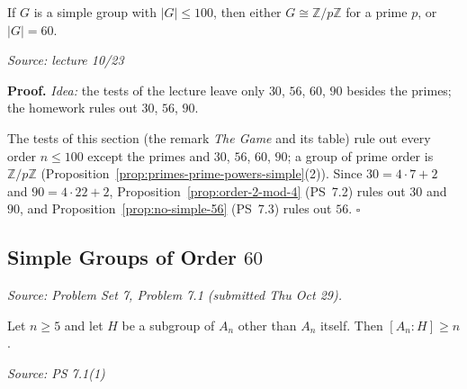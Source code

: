 \documentclass[11pt]{report}
\renewenvironment{proof}[1][Proof]{\noindent\textbf{#1.} }{\hfill$\square$\par\vspace{5pt}}
\newcommand{\srcline}[1]{\par\hfill{\footnotesize\textit{Source: #1}}}
\begin{document}
\begin{thmbox}\label{thm:simple-order-le-100}
If $G$ is a simple group with $|G| \leq 100$, then either $G \cong \mathbb{Z}/p\mathbb{Z}$ for a prime $p$, or $|G| = 60$.
\srcline{lecture 10/23}
\end{thmbox}

\begin{proof}
\textit{Idea:} the tests of the lecture leave only $30$, $56$, $60$, $90$ besides the primes; the homework rules out $30$, $56$, $90$.\par
The tests of this section (the remark \emph{The Game} and its table) rule out every order $n \le 100$ except the primes and $30$, $56$, $60$, $90$; a group of prime order is $\mathbb{Z}/p\mathbb{Z}$ (Proposition~\ref{prop:primes-prime-powers-simple}(2)). Since $30 = 4 \cdot 7 + 2$ and $90 = 4 \cdot 22 + 2$, Proposition~\ref{prop:order-2-mod-4} (PS~7.2) rules out $30$ and $90$, and Proposition~\ref{prop:no-simple-56} (PS~7.3) rules out $56$.
\end{proof}

\subsection{Simple Groups of Order \texorpdfstring{$60$}{60}}\label{sub:order-60}

\textit{Source: Problem Set 7, Problem 7.1 (submitted Thu Oct 29).}

\begin{propbox}\label{prop:an-subgroup-index}
Let $n \geq 5$ and let $H$ be a subgroup of $A_n$ other than $A_n$ itself. Then $[A_n : H] \geq n$.
\srcline{PS 7.1(1)}
\end{propbox}
\end{document}
